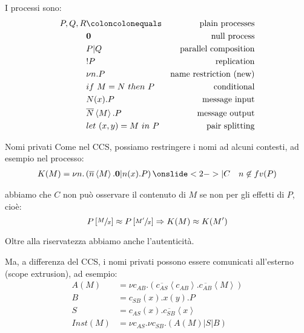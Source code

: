 \documentclass{beamer}
\theoremstyle{plain}
\theoremstyle{definition}
\theoremstyle{remark}
\newcommand{\obar}[1]{\overline{#1}}
\newcommand{\pa}[1]{\left(#1\right)}
\newcommand{\ang}[1]{\left<#1\right>}
\newcommand{\bra}[1]{\left[#1\right]}
\begin{document}
\begin{frame}
  I processi sono:
  \begin{align*}
    P,Q,R & \coloncolonequals & \text{plain processes} \\
          & \mathbf{0} & \text{null process} \\
          & P | Q & \text{parallel composition} \\
          & !P & \text{replication} \\
          & \nu n.P & \text{name restriction (new)} \\
          & if\ M=N\ then\ P & \text{conditional} \\
          & N(x).P & \text{message input} \\
          & \obar{N}\left< M\right> .P & \text{message output} \\
          & let\ (x,y) = M\ in\ P & \text{pair splitting}
  \end{align*}
\end{frame}

\begin{frame}{Nomi privati}
  Come nel CCS, possiamo restringere i nomi ad alcuni contesti, ad
  esempio nel processo:
  \begin{align*}
  K(M) = \nu n. \pa{ \obar{n}\ang{M}.\mathbf{0} | n(x).P }
    \onslide<2->{ |C }& &  n\not\in
    fv(P)
  \end{align*}

  abbiamo che $C$ non pu\`o osservare il contenuto di $M$ se non per gli effetti
  di $P$, cioè:
  \[ P\bra{\sfrac{M}{x}} \approx P\bra{\sfrac{M'}{x}} \Rightarrow K(M)
    \approx K(M') \]
  
  Oltre alla riservatezza abbiamo anche l'autenticit\`a.
\end{frame}

\begin{frame}
  Ma, a differenza del CCS, i nomi privati possono essere comunicati
  all'esterno (scope extrusion), ad esempio:
  \begin{align*}
    A(M) & = \nu
           c_{AB}. \pa{\obar{c_{AS}}\ang{c_{AB}}. \obar{c_{AB}}\ang{M}}
    \\
    B & = c_{SB}(x). x(y) .P \\
    S & = c_{AS}(x) . \obar{c_{SB}} \ang{x} \\
    Inst(M) & = \nu c_{AS}. \nu c_{SB}. \pa{ A(M) | S | B}
  \end{align*}
  \begin{center}
  \end{center}
\end{frame}
\end{document}
